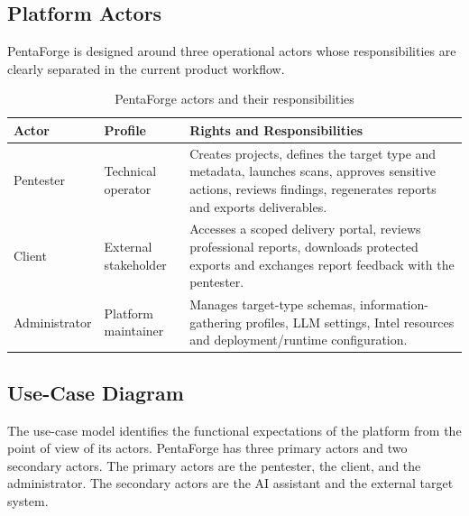 \documentclass[12pt,a4paper]{report}
\begin{document}
\subsection{Platform Actors}

PentaForge is designed around three operational actors whose responsibilities are
clearly separated in the current product workflow.

\begin{table}[H]
    \centering
    \renewcommand{\arraystretch}{1.35}
    \begin{tabular}{|p{}|p{}|p{}|}
        \hline
        \textbf{Actor} & \textbf{Profile} & \textbf{Rights and Responsibilities} \\
        \hline
        Pentester & Technical operator & Creates projects, defines the target type
        and metadata, launches scans, approves sensitive actions, reviews findings,
        regenerates reports and exports deliverables. \\
        \hline
        Client & External stakeholder & Accesses a scoped delivery portal, reviews
        professional reports, downloads protected exports and exchanges report
        feedback with the pentester. \\
        \hline
        Administrator & Platform maintainer & Manages target-type schemas,
        information-gathering profiles, LLM settings, Intel resources and
        deployment/runtime configuration. \\
        \hline
    \end{tabular}
    \caption{PentaForge actors and their responsibilities}
    \label{tab:actors}
\end{table}

\subsection{Use-Case Diagram}

The use-case model identifies the functional expectations of the platform from the
point of view of its actors. PentaForge has three primary actors and two secondary
actors. The primary actors are the pentester, the client, and the administrator.
The secondary actors are the AI assistant and the external target system.
\end{document}
